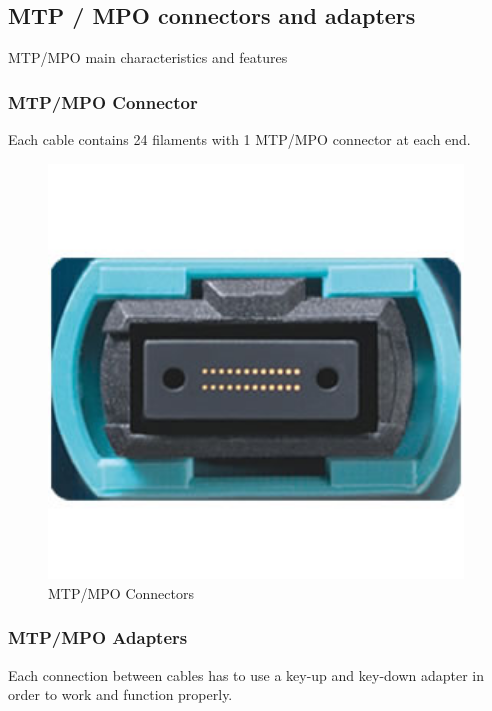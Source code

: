 \subsection{MTP / MPO connectors and adapters}

MTP/MPO main characteristics and features

\subsubsection{MTP/MPO Connector}

Each cable contains 24 filaments with 1 MTP/MPO connector at each end.

\begin{figure}
  \includegraphics[width=11cm]{images/3.jpg}
  \centering
  \caption{MTP/MPO Connectors}
  \label{fig:jlsimon}
\end{figure}

\subsubsection{MTP/MPO Adapters}

Each connection between cables has to use a key-up and key-down adapter in order to work and function properly.

